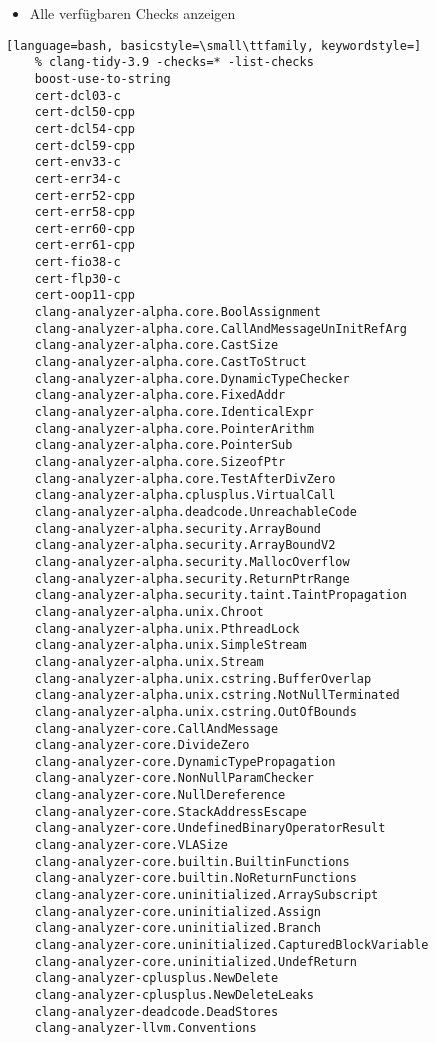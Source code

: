 \documentclass[aspectratio=169]{beamer}
\begin{document}
\begin{itemize}
\item Alle verfügbaren Checks anzeigen
\end{itemize}
\begin{lstlisting}[language=bash, basicstyle=\small\ttfamily, keywordstyle=]
    % clang-tidy-3.9 -checks=* -list-checks
    boost-use-to-string
    cert-dcl03-c
    cert-dcl50-cpp
    cert-dcl54-cpp
    cert-dcl59-cpp
    cert-env33-c
    cert-err34-c
    cert-err52-cpp
    cert-err58-cpp
    cert-err60-cpp
    cert-err61-cpp
    cert-fio38-c
    cert-flp30-c
    cert-oop11-cpp
    clang-analyzer-alpha.core.BoolAssignment
    clang-analyzer-alpha.core.CallAndMessageUnInitRefArg
    clang-analyzer-alpha.core.CastSize
    clang-analyzer-alpha.core.CastToStruct
    clang-analyzer-alpha.core.DynamicTypeChecker
    clang-analyzer-alpha.core.FixedAddr
    clang-analyzer-alpha.core.IdenticalExpr
    clang-analyzer-alpha.core.PointerArithm
    clang-analyzer-alpha.core.PointerSub
    clang-analyzer-alpha.core.SizeofPtr
    clang-analyzer-alpha.core.TestAfterDivZero
    clang-analyzer-alpha.cplusplus.VirtualCall
    clang-analyzer-alpha.deadcode.UnreachableCode
    clang-analyzer-alpha.security.ArrayBound
    clang-analyzer-alpha.security.ArrayBoundV2
    clang-analyzer-alpha.security.MallocOverflow
    clang-analyzer-alpha.security.ReturnPtrRange
    clang-analyzer-alpha.security.taint.TaintPropagation
    clang-analyzer-alpha.unix.Chroot
    clang-analyzer-alpha.unix.PthreadLock
    clang-analyzer-alpha.unix.SimpleStream
    clang-analyzer-alpha.unix.Stream
    clang-analyzer-alpha.unix.cstring.BufferOverlap
    clang-analyzer-alpha.unix.cstring.NotNullTerminated
    clang-analyzer-alpha.unix.cstring.OutOfBounds
    clang-analyzer-core.CallAndMessage
    clang-analyzer-core.DivideZero
    clang-analyzer-core.DynamicTypePropagation
    clang-analyzer-core.NonNullParamChecker
    clang-analyzer-core.NullDereference
    clang-analyzer-core.StackAddressEscape
    clang-analyzer-core.UndefinedBinaryOperatorResult
    clang-analyzer-core.VLASize
    clang-analyzer-core.builtin.BuiltinFunctions
    clang-analyzer-core.builtin.NoReturnFunctions
    clang-analyzer-core.uninitialized.ArraySubscript
    clang-analyzer-core.uninitialized.Assign
    clang-analyzer-core.uninitialized.Branch
    clang-analyzer-core.uninitialized.CapturedBlockVariable
    clang-analyzer-core.uninitialized.UndefReturn
    clang-analyzer-cplusplus.NewDelete
    clang-analyzer-cplusplus.NewDeleteLeaks
    clang-analyzer-deadcode.DeadStores
    clang-analyzer-llvm.Conventions

\end{lstlisting}
\end{document}
